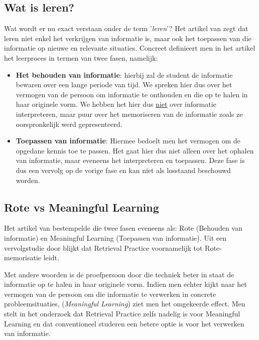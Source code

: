 \documentclass{hogent-article}
\begin{document}
\subsection{Wat is leren?}
Wat wordt er nu exact verstaan onder de term '\textit{leren}'? Het artikel van \textcite{Mayer_2002} zegt dat leren niet enkel het verkrijgen van informatie is, maar ook het toepassen van die informatie op nieuwe en relevante situaties. Concreet definieert men in het artikel het leerproces in termen van twee fasen, namelijk:\\

\begin{itemize}
	\item \textbf{Het behouden van informatie}: hierbij zal de student de informatie bewaren over een lange periode van tijd. We spreken hier dus over het vermogen van de persoon om informatie te onthouden en die op te halen in haar originele vorm. We hebben het hier dus \underline{niet} over informatie interpreteren, maar puur over het memoriseren van de informatie zoals ze oorspronkelijk werd gepresenteerd.\\
	
	\item \textbf{Toepassen van informatie}: Hiermee bedoelt men het vermogen om de opgedane kennis toe te passen. Het  gaat hier dus niet alleen over het ophalen van informatie, maar eveneens het interpreteren en toepassen. Deze fase is dus een vervolg op de vorige fase en kan niet als losstaand beschouwd worden.
\end{itemize}

\subsection{Rote vs Meaningful Learning}
\label{RoteVSMeaningful}
Het artikel van \textcite{Mayer_2002} bestempelde die twee fasen eveneens als: Rote (Behouden van informatie) en Meaningful Learning (Toepassen van informatie). Uit een vervolgstudie door \textcite{van_Gog_2012} blijkt dat Retrieval Practice voornamelijk tot Rote-memorisatie leidt.\\

\par
\noindent
Met andere woorden is de proefpersoon door die techniek beter in staat de informatie op te halen in haar originele vorm. Indien men echter kijkt naar het vermogen van de persoon om die informatie te verwerken in concrete probleemsituaties, (\textit{Meaningful Learning}) ziet men het omgekeerde effect. Men stelt in het onderzoek dat Retrieval Practice zelfs nadelig is voor Meaningful Learning en dat conventioneel studeren een betere optie is voor het verwerken van informatie.
\par
\noindent
\end{document}
